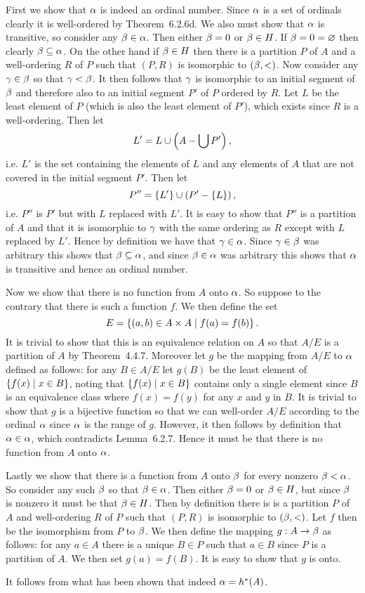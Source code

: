 {{    First we show that $\alpha$ is indeed an ordinal number.
    Since $\alpha$ is a set of ordinals clearly it is well-ordered by Theorem~6.2.6d.
    We also must show that $\alpha$ is transitive, so consider any $\beta \in \alpha$.
    Then either $\beta = 0$ or $\beta \in H$.
    If $\beta = 0 = \varnothing$ then clearly $\beta \subseteq \alpha$.
    On the other hand if $\beta \in H$ then there is a partition $P$ of $A$ and a well-ordering $R$ of $P$ such that $(P, R)$ is isomorphic to $(\beta, <)$.
    Now consider any $\gamma \in \beta$ so that $\gamma < \beta$.
    It then follows that $\gamma$ is isomorphic to an initial segment of $\beta$ and therefore also to an initial segment $P'$ of $P$ ordered by $R$.
    Let $L$ be the least element of $P$ (which is also the least element of $P'$), which exists since $R$ is a well-ordering.
    Then let
    $$
      L' = L \cup \left( A - \bigcup P' \right),
    $$
    i.e. $L'$ is the set containing the elements of $L$ and any elements of $A$ that are not covered in the initial segment $P'$.
    Then let
    $$
      P'' = \left\{ L' \right\} \cup \left( P' - \left\{ L \right\} \right),
    $$
    i.e. $P''$ is $P'$ but with $L$ replaced with $L'$.
    It is easy to show that $P''$ is a partition of $A$ and that it is isomorphic to $\gamma$ with the same ordering as $R$ except with $L$ replaced by $L'$.
    Hence by definition we have that $\gamma \in \alpha$.
    Since $\gamma \in \beta$ was arbitrary this shows that $\beta \subseteq \alpha$, and since $\beta \in \alpha$ was arbitrary this shows that $\alpha$ is transitive and hence an ordinal number.

    Now we show that there is no function from $A$ onto $\alpha$.
    So suppose to the contrary that there is such a function $f$.
    We then define the set
    $$
      E = \left\{ (a,b) \in A \times A \mid f(a) = f(b) \right\}.
    $$
    It is trivial to show that this is an equivalence relation on $A$ so that $A/E$ is a partition of $A$ by Theorem~4.4.7.
    Moreover let $g$ be the mapping from $A/E$ to $\alpha$ defined as follows: for any $B \in A/E$ let $g(B)$ be the least element of $\left\{ f(x) \mid x \in B \right\}$, noting that $\left\{ f(x) \mid x \in B \right\}$ contains only a single element since $B$ is an equivalence class where $f(x) = f(y)$ for any $x$ and $y$ in $B$.
    It is trivial to show that $g$ is a bijective function so that we can well-order $A/E$ according to the ordinal $\alpha$ since $\alpha$ is the range of $g$.
    However, it then follows by definition that $\alpha \in \alpha$, which contradicts Lemma~6.2.7.
    Hence it must be that there is no function from $A$ onto $\alpha$.

    Lastly we show that there is a function from $A$ onto $\beta$ for every nonzero $\beta < \alpha$.
    So consider any such $\beta$ so that $\beta \in \alpha$.
    Then either $\beta = 0$ or $\beta \in H$, but since $\beta$ is nonzero it must be that $\beta \in H$.
    Then by definition there is is a partition $P$ of $A$ and well-ordering $R$ of $P$ such that $(P,R)$ is isomorphic to $(\beta,<)$.
    Let $f$ then be the isomorphism from $P$ to $\beta$.
    We then define the mapping $g : A \to \beta$ as follows: for any $a \in A$ there is a unique $B \in P$ such that $a \in B$ since $P$ is a partition of $A$.
    We then set $g(a) = f(B)$.
    It is easy to show that $g$ is onto.

    It follows from what has been shown that indeed $\alpha = h^*(A)$.
  }
}
